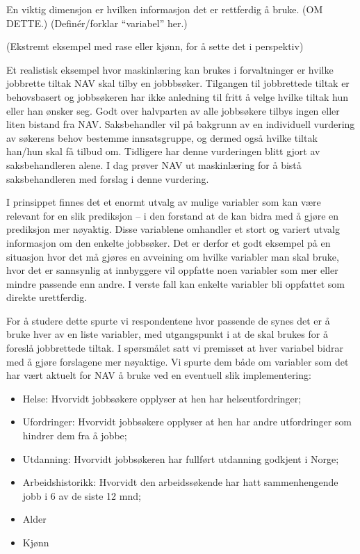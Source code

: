 \documentclass[
]{book}
\begin{document}
En viktig dimensjon er hvilken informasjon det er rettferdig å bruke.
(OM DETTE.)
(Definér/forklar ``variabel'' her.)

(Ekstremt eksempel med rase eller kjønn, for å sette det i perspektiv)

Et realistisk eksempel hvor maskinlæring kan brukes i forvaltninger er hvilke jobbrette tiltak NAV skal tilby en jobbbsøker. Tilgangen til jobbrettede tiltak er behovsbasert og jobbsøkeren har ikke anledning til fritt å velge hvilke tiltak hun eller han ønsker seg. Godt over halvparten av alle jobbsøkere tilbys ingen eller liten bistand fra NAV. Saksbehandler vil på bakgrunn av en individuell vurdering av søkerens behov bestemme innsatsgruppe, og dermed også hvilke tiltak han/hun skal få tilbud om. Tidligere har denne vurderingen blitt gjort av saksbehandleren alene. I dag prøver NAV ut maskinlæring for å bistå saksbehandleren med forslag i denne vurdering.

I prinsippet finnes det et enormt utvalg av mulige variabler som kan være relevant for en slik prediksjon -- i den forstand at de kan bidra med å gjøre en prediksjon mer nøyaktig. Disse variablene omhandler et stort og variert utvalg informasjon om den enkelte jobbsøker. Det er derfor et godt eksempel på en situasjon hvor det må gjøres en avveining om hvilke variabler man skal bruke, hvor det er sannsynlig at innbyggere vil oppfatte noen variabler som mer eller mindre passende enn andre. I verste fall kan enkelte variabler bli oppfattet som direkte urettferdig.

For å studere dette spurte vi respondentene hvor passende de synes det er å bruke hver av en liste variabler, med utgangspunkt i at de skal brukes for å foreslå jobbrettede tiltak. I spørsmålet satt vi premisset at hver variabel bidrar med å gjøre forslagene mer nøyaktige. Vi spurte dem både om variabler som det har vært aktuelt for NAV å bruke ved en eventuell slik implementering:

\begin{itemize}
\item
  Helse: Hvorvidt jobbsøkere opplyser at hen har helseutfordringer;
\item
  Ufordringer: Hvorvidt jobbsøkere opplyser at hen har andre utfordringer som hindrer dem fra å jobbe;
\item
  Utdanning: Hvorvidt jobbsøkeren har fullført utdanning godkjent i Norge;
\item
  Arbeidshistorikk: Hvorvidt den arbeidssøkende har hatt sammenhengende jobb i 6 av de siste 12 mnd;
\item
  Alder
\item
  Kjønn
\end{itemize}
\end{document}
